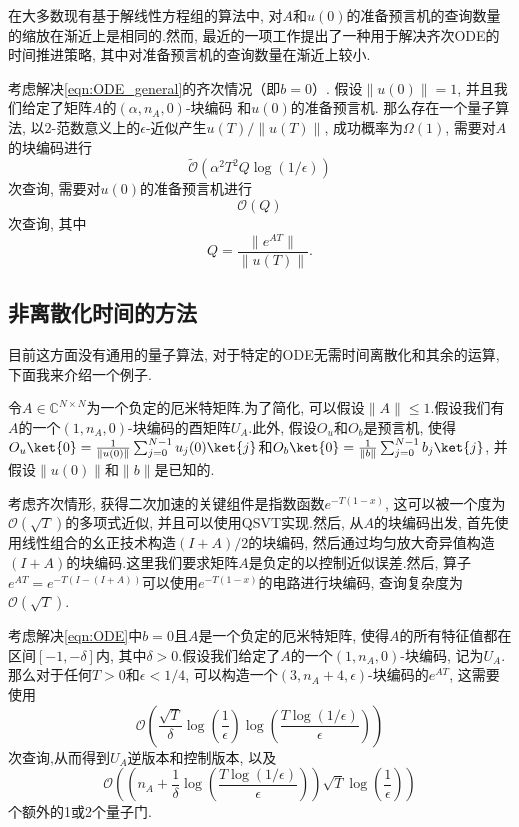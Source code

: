在大多数现有基于解线性方程组的算法中, 对$A$和$u(0)$的准备预言机的查询数量的缩放在渐近上是相同的.然而, 最近的一项工作\cite{35}提出了一种用于解决齐次ODE的时间推进策略, 其中对准备预言机的查询数量在渐近上较小.
\begin{method}[\cite{34}]\label{lem:DEsolver_TM}
	考虑解决\cref{eqn:ODE_general}的齐次情况（即$b = 0$）.
	假设$\|u(0)\| = 1$, 并且我们给定了矩阵$A$的$(\alpha,n_A,0)$-块编码 \cite{36}和$u(0)$的准备预言机.
	那么存在一个量子算法, 以$2$-范数意义上的$\epsilon$-近似产生$u(T)/\|u(T)\|$, 成功概率为$\Omega(1)$, 
	需要对$A$的块编码进行
	$$
	\widetilde{\mathcal{O}}\left( \alpha^2 T^2 Q \log(1/\epsilon) \right)
	$$
	次查询, 需要对$u(0)$的准备预言机进行
	$$
	\mathcal{O}\left( Q \right)
	$$
	次查询, 其中
	$$
	Q = \frac{\|e^{AT}\|}{\|u(T)\|}.
	$$
\end{method}

\subsection{非离散化时间的方法}
目前这方面没有通用的量子算法, 对于特定的ODE无需时间离散化和其余的运算, 下面我来介绍一个例子.

令$A \in \mathbb{C}^{N\times N}$为一个负定的厄米特矩阵.为了简化, 可以假设$\|A\| \leq 1$.假设我们有$A$的一个$(1,n_A,0)$-块编码的酉矩阵$U_A$.此外, 假设$O_u$和$O_b$是预言机, 使得$O_u \ket{0} = \frac{1}{\|u(0)\|} \sum_{j=0}^{N-1} u_j(0) \ket{j}$和$O_b \ket{0} = \frac{1}{\|b\|} \sum_{j=0}^{N-1} b_j \ket{j}$, 并假设$\|u(0)\|$和$\|b\|$是已知的.\par
考虑齐次情形, 获得二次加速的关键组件是指数函数$e^{-T(1-x)}$\cite{31}\cite{36}, 这可以被一个度为$\mathcal{O}(\sqrt{T})$的多项式近似, 并且可以使用QSVT\cite{36}实现.然后, 从$A$的块编码出发, 首先使用线性组合的幺正技术\cite{37}构造$(I+A)/2$的块编码, 然后通过均匀放大奇异值构造$(I+A)$的块编码\cite{36}.这里我们要求矩阵$A$是负定的以控制近似误差.然后, 算子$e^{AT} = e^{-T(I-(I+A))}$可以使用$e^{-T(1-x)}$的电路进行块编码, 查询复杂度为$\mathcal{O}(\sqrt{T})$.
\begin{theorem}
	考虑解决\cref{eqn:ODE}中$b = 0$且$A$是一个负定的厄米特矩阵, 使得$A$的所有特征值都在区间$[-1,-\delta]$内, 其中$\delta > 0$.假设我们给定了$A$的一个$(1,n_A,0)$-块编码, 记为$U_A$.那么对于任何$T>0$和$\epsilon<1/4$, 可以构造一个$(3,n_A+4,\epsilon)$-块编码的$e^{AT}$, 这需要使用
	\begin{equation}
		\mathcal{O}\left(  \frac{\sqrt{T}}{\delta}\log\left(\frac{1}{\epsilon}\right)\log\left(\frac{T\log(1/\epsilon)}{\epsilon}\right) \right)
	\end{equation}
	次查询,从而得到$U_A$逆版本和控制版本, 以及
	\begin{equation}
		\mathcal{O}\left(\left(n_A+\frac{1}{\delta}\log\left(\frac{T\log(1/\epsilon)}{\epsilon}\right)\right)\sqrt{T}\log\left(\frac{1}{\epsilon}\right) \right)
	\end{equation}
	个额外的1或2个量子门.
\end{theorem}

